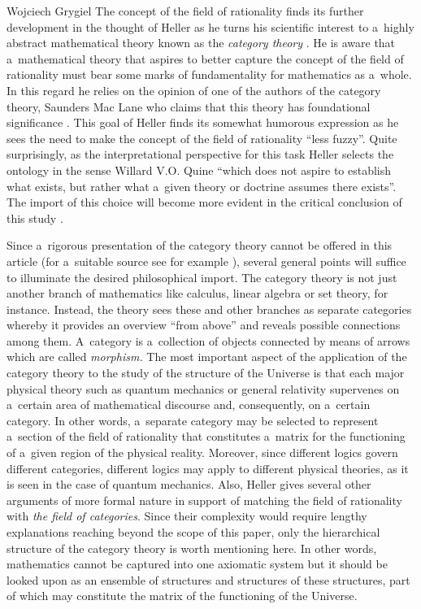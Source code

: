 \begin{artengenv}{Wojciech Grygiel}
The concept of the field of rationality finds its further development in the thought of Heller as he turns his scientific interest to a~highly abstract mathematical theory known as the \textit{category theory}
\parencite[][]{heller_field_2014}. %
 He is aware that a~mathematical theory that aspires to better capture the concept of the field of rationality must bear some marks of fundamentality for mathematics as a~whole. In this regard he relies on the opinion of one of the authors of the category theory, Saunders Mac Lane who claims that this theory has foundational significance 
\parencite[][]{mac_lane_protean_1992}. %
 This goal of Heller finds its somewhat humorous expression as he sees the need to make the concept of the field of rationality ``less fuzzy''. Quite surprisingly, as the interpretational perspective for this task Heller selects the ontology in the sense Willard V.O. Quine ``which does not aspire to establish what exists, but rather what a~given theory or doctrine assumes there exists''. The import of this choice will become more evident in the critical conclusion of this study 
\parencite[][p.442]{heller_field_2014}.%


Since a~rigorous presentation of the category theory cannot be offered in this article (for a~suitable source see for example
\parencite[][]{simmons_introduction_2011}%
), several general points will suffice to illuminate the desired philosophical import. The category theory is not just another branch of mathematics like calculus, linear algebra or set theory, for instance. Instead, the theory sees these and other branches as separate categories whereby it provides an overview ``from above'' and reveals possible connections among them. A~category is a~collection of objects connected by means of arrows which are called \textit{morphism.} The most important aspect of the application of the category theory to the study of the structure of the Universe is that each major physical theory such as quantum mechanics or general relativity supervenes on a~certain area of mathematical discourse and, consequently, on a~certain category. In other words, a~separate category may be selected to represent a~section of the field of rationality that constitutes a~matrix for the functioning of a~given region of the physical reality. Moreover, since different logics govern different categories, different logics may apply to different physical theories, as it is seen in the case of quantum mechanics. Also, Heller gives several other arguments of more formal nature in support of matching the field of rationality with \textit{the field of categories}. Since their complexity would require lengthy explanations reaching beyond the scope of this paper, only the hierarchical structure of the category theory is worth mentioning here. In other words, mathematics cannot be captured into one axiomatic system but it should be looked upon as an ensemble of structures and structures of these structures, part of which may constitute the matrix of the functioning of the Universe.


\end{artengenv}
